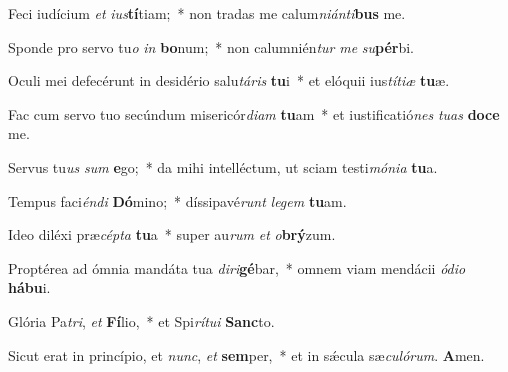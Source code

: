 \item Feci iudícium \textit{et} \textit{ius}\textbf{tí}tiam;~* non tradas me calum\textit{ni}\textit{án}\textit{ti}\textbf{bus} me.

\item Sponde pro servo tu\textit{o} \textit{in} \textbf{bo}num;~* non calumnién\textit{tur} \textit{me} \textit{su}\textbf{pér}bi.

\item Oculi mei defecérunt in desidério salu\textit{tá}\textit{ris} \textbf{tu}i~* et elóquii ius\textit{tí}\textit{ti}\textit{æ} \textbf{tu}æ.

\item Fac cum servo tuo secúndum misericór\textit{di}\textit{am} \textbf{tu}am~* et iustificatió\textit{nes} \textit{tu}\textit{as} \textbf{do}\textbf{ce} me.

\item Servus tu\textit{us} \textit{sum} \textbf{e}go;~* da mihi intelléctum, ut sciam testi\textit{mó}\textit{ni}\textit{a} \textbf{tu}a.

\item Tempus faci\textit{én}\textit{di} \textbf{Dó}mino;~* díssipavé\textit{runt} \textit{le}\textit{gem} \textbf{tu}am.

\item Ideo diléxi præ\textit{cép}\textit{ta} \textbf{tu}a~* super au\textit{rum} \textit{et} \textit{o}\textbf{brý}zum.

\item Proptérea ad ómnia mandáta tua \textit{di}\textit{ri}\textbf{gé}bar,~* omnem viam mendácii \textit{ó}\textit{di}\textit{o} \textbf{há}\textbf{bu}i.

\item Glória Pa\textit{tri}, \textit{et} \textbf{Fí}lio,~* et Spi\textit{rí}\textit{tu}\textit{i} \textbf{Sanc}to.

\item Sicut erat in princípio, et \textit{nunc}, \textit{et} \textbf{sem}per,~* et in sǽcula sæ\textit{cu}\textit{ló}\textit{rum}. \textbf{A}men.
